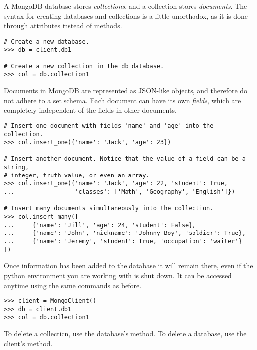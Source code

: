 A MongoDB database stores \emph{collections}, and a collection stores \emph{documents}.
The syntax for creating databases and collections is a little unorthodox, as it is done through attributes instead of methods.

\begin{lstlisting}
# Create a new database.
>>> db = client.db1

# Create a new collection in the db database.
>>> col = db.collection1
\end{lstlisting}

Documents in MongoDB are represented as JSON-like objects, and therefore do not adhere to a set schema.
Each document can have its own \emph{fields}, which are completely independent of the fields in other documents.

\begin{lstlisting}
# Insert one document with fields 'name' and 'age' into the collection.
>>> col.insert_one({'name': 'Jack', 'age': 23})

# Insert another document. Notice that the value of a field can be a string,
# integer, truth value, or even an array.
>>> col.insert_one({'name': 'Jack', 'age': 22, 'student': True,
...                 'classes': ['Math', 'Geography', 'English']})

# Insert many documents simultaneously into the collection.
>>> col.insert_many([
...     {'name': 'Jill', 'age': 24, 'student': False},
...     {'name': 'John', 'nickname': 'Johnny Boy', 'soldier': True},
...     {'name': 'Jeremy', 'student': True, 'occupation': 'waiter'}  ])
\end{lstlisting}

\begin{info}
Once information has been added to the database it will remain there, even if the python environment you are working with is shut down.
It can be accessed anytime using the same commands as before.

\begin{lstlisting}
>>> client = MongoClient()
>>> db = client.db1
>>> col = db.collection1
\end{lstlisting}

To delete a collection, use the database's  method.
To delete a database, use the client's  method.
\end{info}

